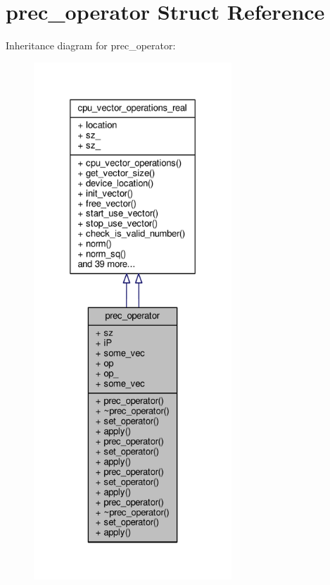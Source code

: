 \hypertarget{structprec__operator}{\section{prec\-\_\-operator Struct Reference}
\label{structprec__operator}
}


Inheritance diagram for prec\-\_\-operator\-:
\nopagebreak
\begin{figure}[H]
\begin{center}
\leavevmode
\includegraphics[height=550pt]{structprec__operator__inherit__graph}
\end{center}
\end{figure}


